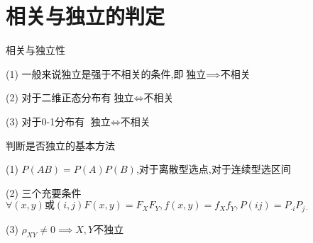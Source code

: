\documentclass[12pt, a4paper, oneside, UTF8]{ctexbook}
\begin{document}
\section{相关与独立的判定}
\begin{remark}
    相关与独立性
    \item[(1)] 一般来说独立是强于不相关的条件,即$\text{独立}\implies\text{不相关}$ 
    \item[(2)] 对于二维正态分布有$\text{独立}\iff\text{不相关}$ 
    \item[(3)] 对于0-1分布有 $\text{独立}\iff\text{不相关}$
\end{remark}
\begin{remark}
    判断是否独立的基本方法
    \item [(1)] $P(AB)=P(A)P(B)$,对于离散型选点,对于连续型选区间 
    \item [(2)] 三个充要条件$\forall (x,y)\text{或}(i,j) F(x,y)=F_XF_Y,f(x,y)=f_Xf_Y,P(ij)=P_{\cdot i}P_{j\cdot}$
    \item [(3)] $\rho_{XY}\neq 0\implies X,Y$不独立
\end{remark}
\end{document}
